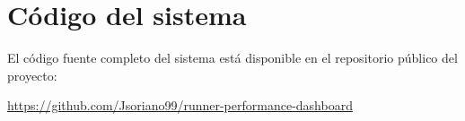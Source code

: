 \chapter{Código del sistema}
\label{anx:codigo}

El código fuente completo del sistema está disponible en el repositorio público del proyecto:

\begin{center}
\url{https://github.com/Jsoriano99/runner-performance-dashboard}
\end{center}

